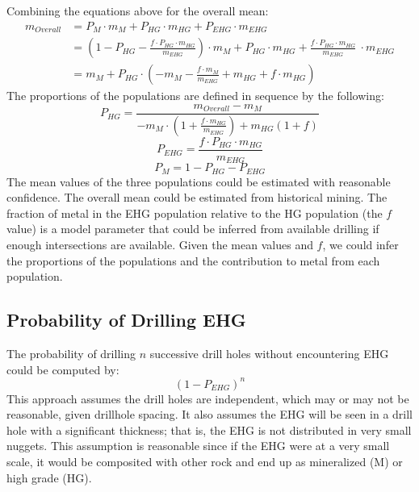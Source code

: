 Combining the equations above for the overall mean:
\begin{align}
    m_{Overall} & = P_{M} \cdot m_{M}  + P_{HG} \cdot m_{HG} + P_{EHG} \cdot m_{EHG} \nonumber                                                                                                  \\
                & = \left(1-P_{HG}-\frac{f \cdot P_{HG} \cdot m_{HG}}{m_{EHG}}\right) \cdot m_{M} + P_{HG} \cdot m_{HG} + \frac{f \cdot P_{HG} \cdot m_{HG}}{m_{EHG}} \ \cdot m_{EHG} \nonumber \\
                & = m_{M} + P_{HG} \cdot \left( -m_{M}-\frac{f \cdot m_{M}}{m_{EHG}}  + m_{HG} + f \cdot m_{HG} \right) \nonumber
\end{align}
The proportions of the populations are defined in sequence by the following:
\[
    P_{HG} =
    \frac{m_{Overall} - m_M}
    {
        -m_M \cdot \left( 1+\frac{f \cdot m_{HG}}{m_{EHG}}\right) + m_{HG}(1+f)
    }
\]
\[
    P_{EHG} = \frac{f \cdot P_{HG} \cdot m_{HG}}{m_{EHG}}
\]
\[
    P_{M} = 1 - P_{HG} - P_{EHG}
\]
The mean values of the three populations could be estimated with reasonable confidence. The overall mean could be estimated from historical mining. The fraction of metal in the \gls{EHG} population relative to the \gls{HG} population (the $f$ value) is a model parameter that could be inferred from available drilling if enough intersections are available. Given the mean values and $f$, we could infer the proportions of the populations and the contribution to metal from each population.

\FloatBarrier
\subsection{Probability of Drilling EHG}
\label{subsec:02probehg}

The probability of drilling $n$ successive drill holes without encountering \gls{EHG} could be computed by:
\[
    \left( 1 - P_{EHG} \right)^n
\]
This approach assumes the drill holes are independent, which may or may not be reasonable, given drillhole spacing. It also assumes the \gls{EHG} will be seen in a drill hole with a significant thickness; that is, the \gls{EHG} is not distributed in very small nuggets. This assumption is reasonable since if the \gls{EHG} were at a very small scale, it would be composited with other rock and end up as mineralized (M) or high grade (HG).


